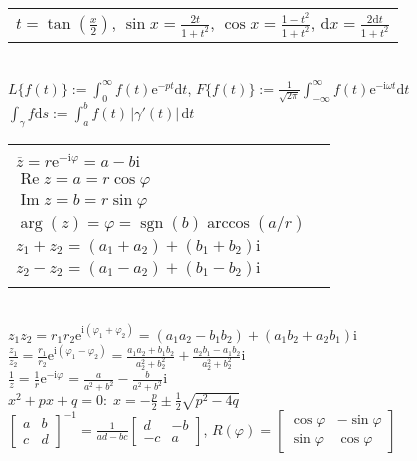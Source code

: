 \documentclass[a4paper,10pt,fleqn,twoside,twocolumn]{scrartcl}
\newcommand{\ee}{\mathrm e}
\newcommand{\ui}{\mathrm i}
\newcommand{\real}{\operatorname{Re}}
\newcommand{\imag}{\operatorname{Im}}
\newcommand{\sgn}{\operatorname{sgn}}
\newcommand{\ds}{\displaystyle}
\begin{document}
\begin{tabular}{@{}l}
$t=\tan(\frac{x}{2})$,\; $\sin x = \frac{2t}{1+t^2}$,\;
$\cos x = \frac{1-t^2}{1+t^2}$,\; $\mathrm dx = \frac{2\mathrm dt}{1+t^2}$
\end{tabular}\\
$L\{f(t)\} := \int_0^{\infty}\! f(t)\ee^{-pt}\mathrm dt$,\;
$F\{f(t)\} := \frac{1}{\sqrt{2\pi}}\int_{-\infty}^{\infty}
f(t)\ee^{-\ui\omega t}\mathrm dt$\\
$\int_\gamma f\mathrm ds := \int_a^b\! f(t)\,|\gamma'(t)|\,\mathrm dt$

\newpage
\noindent
\begin{tabular}{@{}l|l}
\makecell[lt]{
$z = r\ee^{\ui\varphi} = a+b\ui$\\
$\overline z = r\ee^{-\ui\varphi} = a-b\ui$\\
$\real z = a = r\cos\varphi$\\
$\imag z = b = r\sin\varphi$
} & \makecell[lt]{
$|z| = r = \sqrt{a^2+b^2}$\\
$\ds\arg(z) =\varphi = \sgn(b)\arccos(a/r)$\\
$z_1+z_2 = (a_1+a_2)+(b_1+b_2)\ui$\\
$z_2-z_2 = (a_1-a_2)+(b_1-b_2)\ui$\\
}
\end{tabular}\\[2pt]
$z_1 z_2 = r_1 r_2 \ee^{\ui(\varphi_1+\varphi_2)}
= (a_1 a_2 - b_1 b_2)+(a_1 b_2+a_2 b_1)\ui$\\
$\ds\frac{z_1}{z_2}
=\frac{r_1}{r_2}\ee^{\ui(\varphi_1-\varphi_2)}
=\frac{a_1 a_2 + b_1 b_2}{a_2^2+b_2^2}
+ \frac{a_2 b_1 - a_1 b_2}{a_2^2+b_2^2}\ui$\\
$\ds\frac{1}{z} =\frac{1}{r}\ee^{-\ui\varphi}
=\frac{a}{a^2+b^2}-\frac{b}{a^2+b^2}\ui$\\[2pt]
$x^2+px+q=0\colon\; x = -\frac{p}{2}\pm\frac{1}{2}\sqrt{p^2-4q}$\\[2pt]
$\ds\begin{bmatrix}a & b\\ c & d\end{bmatrix}^{-1}
= \frac{1}{ad-bc}\begin{bmatrix}d & -b\\ -c & a\end{bmatrix}$,\;\;
$R(\varphi) = \begin{bmatrix}
\cos\varphi & -\sin\varphi\\
\sin\varphi & \cos\varphi
\end{bmatrix}$\\[4pt]
\end{document}
